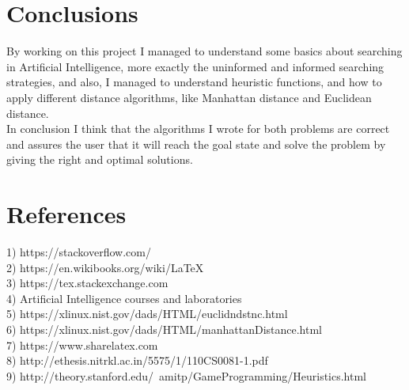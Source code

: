 \documentclass[14pt]{article}
\begin{document}
\section{Conclusions}
By working on this project I managed to understand some basics about searching in Artificial Intelligence, more exactly the uninformed and informed searching strategies, and also, I managed to understand heuristic functions, and how to apply different distance algorithms, like Manhattan distance and Euclidean distance. 
\vspace{2.5 mm}
\\In conclusion I think that the algorithms I wrote for both problems are correct and assures the user that it will reach the goal state and solve the problem by giving the right and optimal solutions.
\newpage
\section{References}
1) https://stackoverflow.com/
\vspace{2.5 mm}
\\2) https://en.wikibooks.org/wiki/LaTeX
\vspace{2.5 mm}
\\3) https://tex.stackexchange.com
\vspace{2.5 mm}
\\4) Artificial Intelligence courses and laboratories
\vspace{2.5 mm}
\\5) https://xlinux.nist.gov/dads/HTML/euclidndstnc.html
\vspace{2.5 mm}
\\6) https://xlinux.nist.gov/dads/HTML/manhattanDistance.html
\vspace{2.5 mm}
\\7) https://www.sharelatex.com
\vspace{2.5 mm}
\\8) http://ethesis.nitrkl.ac.in/5575/1/110CS0081-1.pdf
\vspace{2.5 mm}
\\9) http://theory.stanford.edu/~amitp/GameProgramming/Heuristics.html
\end{document}
